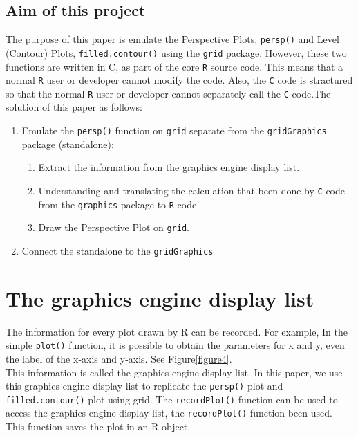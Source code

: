 \documentclass[paper=a4, fontsize=11pt]{report}
\begin{document}
\section{Aim of this project}
The purpose of this paper is emulate the Perspective Plots, \texttt{persp()} and Level (Contour) Plots, \texttt{filled.contour()} using the \texttt{grid} package. However, these two functions are written in C, as part of the core \texttt{R} source code. This means that a normal \texttt{R} user or developer cannot modify the code. Also, the \texttt{C} code is stractured so that the normal \texttt{R} user or developer cannot separately call the \texttt{C} code.The solution of this paper as follows: 
\begin{enumerate}
  \item Emulate the \texttt{persp()} function on \texttt{grid} separate from the \texttt{gridGraphics} package (standalone):
    \begin{enumerate}
      \item Extract the information from the graphics engine display list.
      \item Understanding and translating the calculation that been done by \texttt{C} code from the \texttt{graphics} package to \texttt{R} code
      \item Draw the Perspective Plot on \texttt{grid}.
    \end{enumerate}
  \item Connect the standalone to the \texttt{gridGraphics}
\end{enumerate}





\chapter{The graphics engine display list}
The information for every plot drawn by R can be recorded. For example, In the simple \texttt{plot()} function, it is possible to obtain the parameters for x and y, even the label of the x-axis and y-axis. See Figure\ref{figure4}.\\

This information is called the graphics engine display list. In this paper, we use this graphics engine display list to replicate the \texttt{persp()} plot and \texttt{filled.contour()} plot using grid. The \texttt{recordPlot()} function can be used to access the graphics engine display list, the \texttt{recordPlot()} function been used. This function saves the plot in an R object. 
\end{document}

